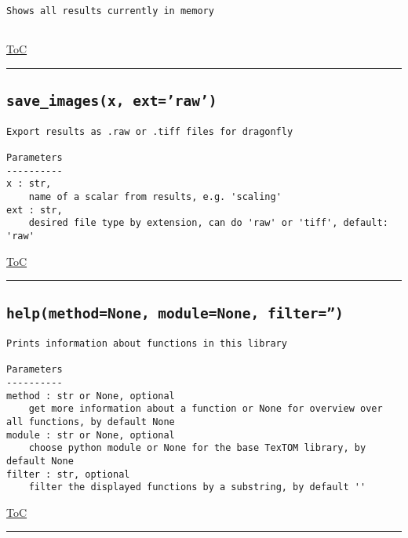\documentclass{article}
\begin{document}
\begin{lstlisting}[language=docstring]
Shows all results currently in memory
    
\end{lstlisting}

\begin{flushright}

\hyperref[toc]{ToC}

\end{flushright}



\vspace{5mm}

\hrule

\subsection*{\texttt{save\_images(x, ext='raw')}}
\label{fun:saveimages}

\begin{lstlisting}[language=docstring]
Export results as .raw or .tiff files for dragonfly

Parameters
----------
x : str,
    name of a scalar from results, e.g. 'scaling'
ext : str,
    desired file type by extension, can do 'raw' or 'tiff', default: 'raw'
\end{lstlisting}

\begin{flushright}

\hyperref[toc]{ToC}

\end{flushright}



\vspace{5mm}

\hrule

\subsection*{\texttt{help(method=None, module=None, filter='')}}
\label{fun:help}

\begin{lstlisting}[language=docstring]
Prints information about functions in this library

Parameters
----------
method : str or None, optional
    get more information about a function or None for overview over all functions, by default None
module : str or None, optional
    choose python module or None for the base TexTOM library, by default None
filter : str, optional
    filter the displayed functions by a substring, by default ''
\end{lstlisting}

\begin{flushright}

\hyperref[toc]{ToC}

\end{flushright}



\vspace{5mm}

\hrule
\end{document}
